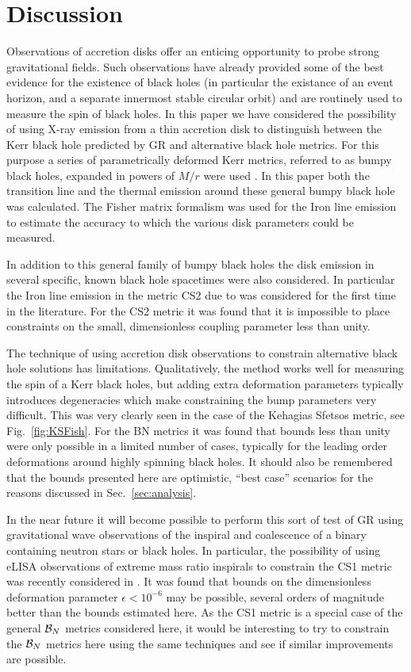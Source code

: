 \documentclass[aps,twocolumn,floatfix,superscriptaddress,longbibliography]{revtex4-1}
\begin{document}
\section{Discussion}\label{sec:discussion}
Observations of accretion disks offer an enticing opportunity to probe strong gravitational fields. Such observations have already provided some of the best evidence for the existence of black holes (in particular the existance of an event horizon, and a separate innermost stable circular orbit) and are routinely used to measure the spin of black holes. In this paper we have considered the possibility of using X-ray emission from a thin accretion disk to distinguish between the Kerr black hole predicted by GR and alternative black hole metrics. For this purpose a series of parametrically deformed Kerr metrics, referred to as bumpy black holes, expanded in powers of $M/r$ were used \cite{2011PhRvD..83j4027V,2011PhRvD..84f4016G}. In this paper both the transition line and the thermal emission around these general bumpy black hole was calculated. The Fisher matrix formalism was used for the Iron line emission to estimate the accuracy to which the various disk parameters could be measured. 

In addition to this general family of bumpy black holes the disk emission in several specific, known black hole spacetimes were also considered. In particular the Iron line emission in the metric CS2 due to \cite{2012PhRvD..86d4037Y} was considered for the first time in the literature. For the CS2 metric it was found that it is impossible to place constraints on the small, dimensionless coupling parameter less than unity.

The technique of using accretion disk observations to constrain alternative black hole solutions has limitations. Qualitatively, the method works well for measuring the spin of a Kerr black holes, but adding extra deformation parameters typically introduces degeneracies which make constraining the bump parameters very difficult. This was very clearly seen in the case of the Kehagias Sfetsos metric, see Fig.~\ref{fig:KSFish}. For the BN metrics it was found that bounds less than unity were only possible in a limited number of cases, typically for the leading order deformations around highly spinning black holes. It should also be remembered that the bounds presented here are optimistic, ``best case'' scenarios for the reasons discussed in Sec.\ \ref{sec:analysis}.

In the near future it will become possible to perform this sort of test of GR using gravitational wave observations of the inspiral and coalescence of a binary containing neutron stars or black holes. In particular, the possibility of using eLISA observations of extreme mass ratio inspirals to constrain the CS1 metric was recently considered in \cite{2012PhRvD..86d4010C}. It was found that bounds on the dimensionless deformation parameter $\epsilon<10^{-6}$ may be possible, several orders of magnitude better than the bounds estimated here. As the CS1 metric is a special case of the general ${\cal{B}}_{N}$ metrics considered here, it would be interesting to try to constrain the ${\cal{B}}_{N}$ metrics here using the same techniques and see if similar improvements are possible.

\clearpage



\clearpage


\end{document}
